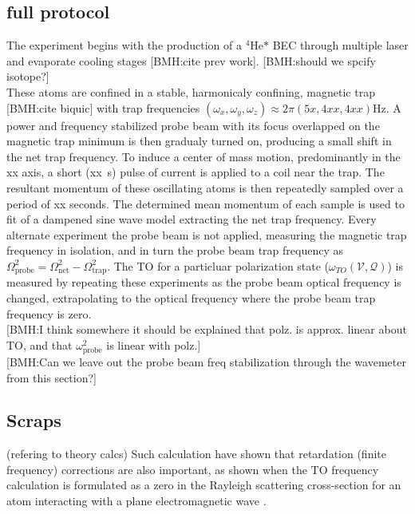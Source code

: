 \documentclass[aps,prl,
,reprint,
superscriptaddress,
onecolumn,
showpacs,preprintnumbers,
 amsmath,amssymb,
]{revtex4-1}
\newcommand{\brycecom}[1]{{\color{ProcessBlue}[BMH:{#1}]\normalcolor}} %
\begin{document}
\subsection{full protocol}

The experiment begins with the production of a $^{4\!}\text{He*}$ BEC through multiple laser and evaporate cooling stages \brycecom{cite prev work}. \brycecom{should we spcify isotope?}\\
These atoms are confined in a stable, harmonicaly confining, magnetic trap \brycecom{cite biquic} with trap frequencies \(\left( \omega_x,\omega_y,\omega_z \right) \approx 2\pi \left(5x,4xx,4xx \right)\textrm{Hz}\). A power and frequency stabilized probe beam with its focus overlapped on the magnetic trap minimum is then gradualy turned on, producing a small shift in the net trap frequency.
To induce a center of mass motion, predominantly in the xx axis, a short (xx~{\textmu}s) pulse of current is applied to a coil near the trap. 
The resultant momentum of these oscillating atoms is then repeatedly sampled over a period of xx seconds. 
The determined mean momentum of each sample is used to fit of a dampened sine wave model extracting the net trap frequency. 
Every alternate experiment the probe beam is not applied, measuring the magnetic trap frequency in isolation, and in turn the probe beam trap frequency as \(\Omega_{\text{probe}}^2=\Omega_{\text{net}}^2-\Omega_{\text{trap}}^2\). The TO for a particluar polarization state ($\omega_{TO}(\mathcal{V},\mathcal{Q})$) is measured by repeating these experiments as the probe beam optical frequency is changed, extrapolating to the optical frequency where the probe beam trap frequency is zero.\\
\brycecom{I think somewhere it should be explained that polz. is approx. linear about TO, and that \(\omega_{\text{probe}}^2\) is linear with polz.}\\
\brycecom{Can we leave out the probe beam freq stabilization through the wavemeter from this section?}\\ 


\subsection{Scraps}

(refering to theory calcs) Such calculation have shown that retardation (finite frequency) corrections are also important, as shown when the TO frequency calculation is formulated as a zero in the Rayleigh scattering cross-section for an atom interacting with a plane electromagnetic wave \cite{Drake2019}.
\end{document}
